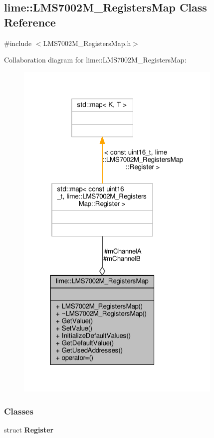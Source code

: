 \subsection{lime\+:\+:L\+M\+S7002\+M\+\_\+\+Registers\+Map Class Reference}
\label{classlime_1_1LMS7002M__RegistersMap}


{\ttfamily \#include $<$L\+M\+S7002\+M\+\_\+\+Registers\+Map.\+h$>$}



Collaboration diagram for lime\+:\+:L\+M\+S7002\+M\+\_\+\+Registers\+Map\+:
\nopagebreak
\begin{figure}[H]
\begin{center}
\leavevmode
\includegraphics[width=280pt]{d9/df0/classlime_1_1LMS7002M__RegistersMap__coll__graph}
\end{center}
\end{figure}
\subsubsection*{Classes}
\begin{DoxyCompactItemize}
\item 
struct {\bf Register}
\end{DoxyCompactItemize}
